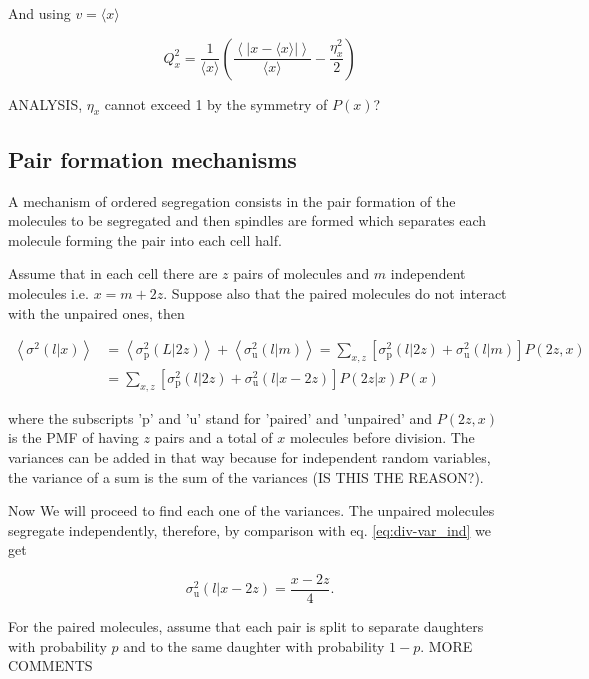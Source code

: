 And using $v=\langle x\rangle$

\begin{equation}
  \boxed{Q_x^2 = \frac{1}{\langle x\rangle}\left(\frac{\left\langle\left|x-\langle x\rangle\right|\right\rangle}{\langle x\rangle}-\frac{\eta_x^2}{2}\right)}
\end{equation}

ANALYSIS, $\eta_x$ cannot exceed 1 by the symmetry of $P(x)$?

\subsection{Pair formation mechanisms}
A mechanism of ordered segregation consists in the pair formation of the molecules to be segregated and then spindles are formed which separates each molecule forming the pair into each cell half.

Assume that in each cell there are $z$ pairs of molecules and $m$ independent molecules i.e. $x=m+2z$. Suppose also that the paired molecules do not interact with the unpaired ones, then

\begin{equation}
  \label{eq:div-pu}
  \begin{split}
  \left\langle\sigma^2(l|x)\right\rangle &= \left\langle\sigma^2_\text{p}(L|2z)\right\rangle + \left\langle\sigma^2_\text{u}(l|m)\right\rangle = \sum_{x,z}\left[\sigma^2_\text{p}(l|2z) + \sigma^2_\text{u}(l|m)\right]P(2z,x)\\
  &= \sum_{x,z}\left[\sigma^2_\text{p}(l|2z) + \sigma^2_\text{u}(l|x-2z)\right]P(2z|x)P(x)
  \end{split}
\end{equation}

where the subscripts 'p' and 'u' stand for 'paired' and 'unpaired' and $P(2z,x)$ is the PMF of having $z$ pairs and a total of $x$ molecules before division. The variances can be added in that way because for independent random variables, the variance of a sum is the sum of the variances (IS THIS THE REASON?).

Now We will proceed to find each one of the variances. The unpaired molecules segregate independently, therefore, by comparison with eq. \eqref{eq:div-var_ind} we get

\begin{equation}
  \label{eq:div-u}
  \sigma^2_\text{u}(l|x-2z) = \frac{x-2z}{4}.
\end{equation}

For the paired molecules, assume that each pair is split to separate daughters with probability $p$ and to the same daughter with probability $1-p$. MORE COMMENTS

